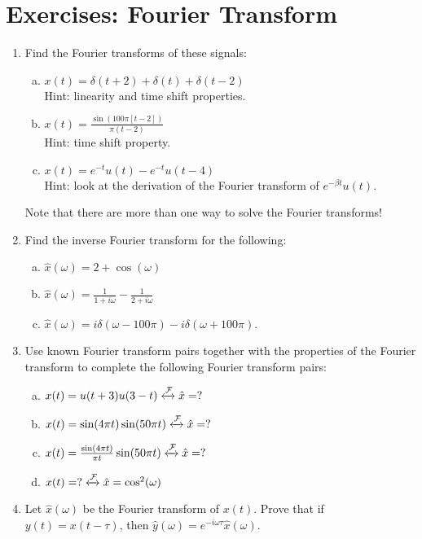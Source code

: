 \newpage
\section{Exercises: Fourier Transform}
\begin{enumerate}
\item Find the Fourier transforms of these signals:
\begin{enumerate}[a)]
\item $x(t)=\delta(t+2)+\delta(t)+\delta(t-2)$ \\Hint: linearity and time shift properties.
\item $x(t)=\frac{\sin(100\pi [t-2])}{\pi (t-2)}$ \\Hint: time shift property.
\item $x(t)=e^{-t}u(t) - e^{-t} u(t-4)$ \\Hint: look at the derivation of the Fourier transform of $e^{-\beta t} u(t)$.
\end{enumerate}
Note that there are more than one way to solve the Fourier transforms!

\item Find the inverse Fourier transform for the following:
\begin{enumerate}[a)]
\item $\hat{x}(\omega)= 2 + \cos(\omega)$
\item $\hat{x}(\omega) = \frac{1}{1+i\omega} - \frac{1}{2+i\omega}$
\item $\hat{x}(\omega) = i \delta(\omega - 100\pi) - i\delta(\omega + 100\pi)$.
\end{enumerate}

\item Use known Fourier transform pairs together with the properties of the Fourier transform to complete the following Fourier transform pairs:
  \begin{enumerate}[a)]
  \item $x(t) = u(t+3)u(3-t) \xleftrightarrow{\mathcal{F}} \hat{x} = ?$
  \item $x(t) = \sin(4\pi t) \sin(50 \pi t)  \xleftrightarrow{\mathcal{F}} \hat{x} = ?$
  \item $x(t) = \frac{\sin(4\pi t)}{\pi t} \sin(50 \pi t)  \xleftrightarrow{\mathcal{F}} \hat{x} = ?$
  \item $x(t) = ?  \xleftrightarrow{\mathcal{F}} \hat{x} = \cos^2(\omega)$    
  \end{enumerate}

\item Let $\hat{x}(\omega)$ be the Fourier transform of $x(t)$. Prove that if $y(t)=x(t-\tau)$, then $\hat{y}(\omega)=e^{-i\omega\tau}\hat{x}(\omega)$. 
  
  
  
  
\end{enumerate}
